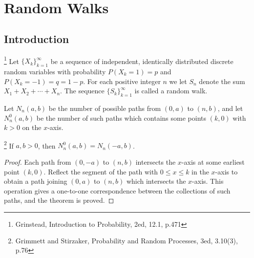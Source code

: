 \chapter{Random Walks}

\section{Introduction}

\begin{definition}
\footnote{Grinstead, Introduction to Probability, 2ed, 12.1, p.471}
Let $\{X_k\}_{k=1}^{\infty}$ be a sequence of independent, identically 
distributed discrete random variables with probability $P(X_k=1)=p$ and 
$P(X_k=-1)=q=1-p$. For each positive integer $n$ we let $S_n$ denote the sum
$X_1+X_2+\cdots+X_n$. The sequence $\{S_k\}_{k=1}^{\infty}$ is called a
random walk.
\end{definition}

Let $N_n(a,b)$ be the number of possible paths from $(0,a)$ to $(n,b)$, and
let $N_n^0(a,b)$ be the number of such paths which contains some points
$(k,0)$ with $k>0$ on the $x$-axis.

\begin{theorem} \label{T:reflect}
\footnote{Grimmett and Stirzaker, Probability and Random Processes, 3ed, 
          3.10(3), p.76}
If $a,b>0$, then $N_n^0(a,b)=N_n(-a,b)$.
\end{theorem}
\begin{proof}
Each path from $(0,-a)$ to $(n,b)$ intersects the $x$-axis at some earliest
point $(k,0)$. Reflect the segment of the path with $0\le x\le k$ in the 
$x$-axis to obtain a path joining $(0,a)$ to $(n,b)$ which intersects the 
$x$-axis. This operation gives a one-to-one correspondence between the 
collections of such paths, and the theorem is proved.
\end{proof}

